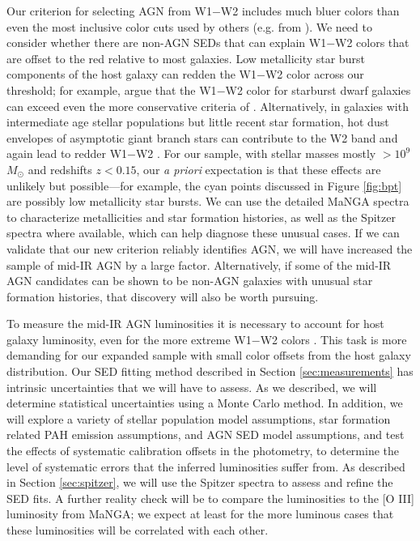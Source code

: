 \documentclass[12pt, preprint]{hacked-aastex}
\begin{document}
 Our criterion for
selecting AGN from W1$-$W2 includes much bluer colors than even the
most inclusive color cuts used by others (e.g. from \cite{assef18a}).
We need to consider whether there are non-AGN SEDs that can explain
W1$-$W2 colors that are offset to the red relative to most galaxies.
Low metallicity star burst components of the host galaxy can redden
the W1$-$W2 color across our threshold; for example,
\cite{hainline16a} argue that the W1$-$W2 color for starburst dwarf
galaxies can exceed even the more conservative criteria of
\cite{stern12a}.  Alternatively, in galaxies with intermediate age
stellar populations but little recent star formation, hot dust
envelopes of asymptotic giant branch stars can contribute to the W2
band and again lead to redder W1$-$W2 \cite{villaume15a}. For our
sample, with stellar masses mostly $> 10^9$ $M_\odot$ and redshifts
$z<0.15$, our {\it a priori} expectation is that these effects are
unlikely but possible---for example, the cyan points discussed in
Figure \ref{fig:bpt} are possibly low metallicity star bursts. We can
use the detailed MaNGA spectra to characterize metallicities and star
formation histories, as well as the Spitzer spectra where available,
which can help diagnose these unusual cases. If we can validate that
our new criterion reliably identifies AGN, we will have increased the
sample of mid-IR AGN by a large factor. Alternatively, if some of the
mid-IR AGN candidates can be shown to be non-AGN galaxies with unusual
star formation histories, that discovery will also be worth pursuing.

 To measure
the mid-IR AGN luminosities it is necessary to account for host galaxy
luminosity, even for the more extreme W1$-$W2 colors
\cite{lacy15a}. This task is more demanding for our expanded sample
with small color offsets from the host galaxy distribution. Our SED
fitting method described in Section \ref{sec:measurements} has
intrinsic uncertainties that we will have to assess. As we described,
we will determine statistical uncertainties using a Monte Carlo
method.  In addition, we will explore a variety of stellar population
model assumptions, star formation related PAH emission assumptions,
and AGN SED model assumptions, and test the effects of systematic
calibration offsets in the photometry, to determine the level of
systematic errors that the inferred luminosities suffer from. As
described in Section \ref{sec:spitzer}, we will use the Spitzer
spectra to assess and refine the SED fits. A further reality check
will be to compare the luminosities to the [O III] luminosity from
MaNGA; we expect at least for the more luminous cases that these
luminosities will be correlated with each other.
\end{document}
